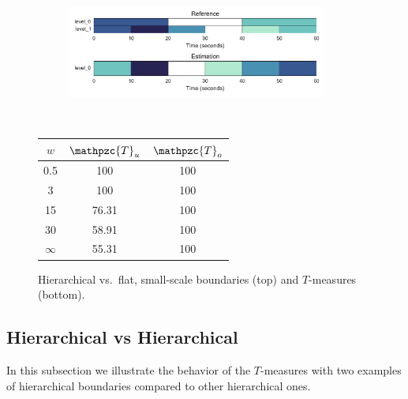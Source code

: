 \documentclass{article}
\def\shag{\ensuremath{\mathpzc{T}}}
\begin{document}
\begin{figure}[t]
  \centering
  \begin{subfigure}{0.5\textwidth}
    \centering
    \includegraphics[width=0.94\textwidth]{figs/hier-flatsmall.pdf}
  \end{subfigure}%
  \\
  \begin{minipage}{0.5\textwidth}
    \centering
    \vspace{10pt}
    \begin{tabular}{|c|c|c|}
      \hline
      $w$       & $\shag_u$    & $\shag_o$      \\
      \hline
      0.5       & 100       & 100      \\     
      3         & 100       & 100      \\
      15        & 76.31     & 100    \\
      30        & 58.91     & 100    \\
      $\infty$  & 55.31     & 100    \\
      \hline
    \end{tabular}
  \end{minipage}
  \caption{Hierarchical vs.\ flat, small-scale boundaries (top) and $T$-measures (bottom).}
  \label{fig:hier-flatsmall}
\end{figure}

\subsection{Hierarchical vs Hierarchical}

In this subsection we illustrate the behavior of the $T$-measures with two examples of hierarchical boundaries compared to other hierarchical ones.

\end{document}
